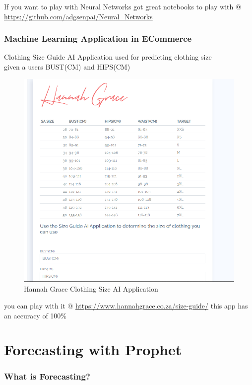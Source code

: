 If you want to play with Neural Networks got great notebooks to play with @ 
\url{https://github.com/adgsenpai/Neural_Networks}

\subsubsection{Machine Learning Application in ECommerce}

Clothing Size Guide AI Application used for predicting clothing size \\
given a users BUST(CM) and HIPS(CM) \\ 

\begin{figure}[H]
    \includegraphics[width=\linewidth]{images/hannahgrace.png}
    \caption{Hannah Grace Clothing Size AI Application}
    \label{fig:clothingai}
\end{figure}

you can play with it @ \url{https://www.hannahgrace.co.za/size-guide/} this app has an accuracy of 100\%

\section{Forecasting with Prophet}
\subsubsection{What is Forecasting?}

